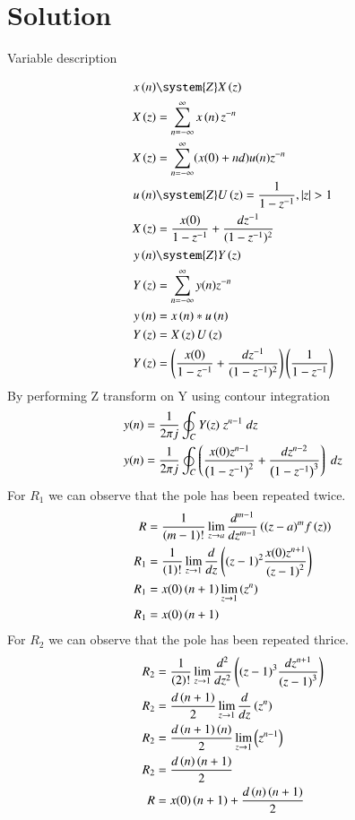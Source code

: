 \documentclass[journal,12pt,twocolumn]{IEEEtran}
\theoremstyle{remark}
\begin{document}
\section*{Solution}
\begin{table}[h]
    \centering
    
    \caption{Variable description}
    \label{tab:11.9.2.11.1}
\end{table}
\begin{align}
	x \brak{n} &\system{Z} X \brak{z} \\
    X \brak{z} &= \sum_{n=-\infty}^{\infty} x \brak{n}   z^{-n}\\
    X \brak{z} & = \sum_{n=-\infty}^{\infty}(x(0)+nd)u(n)z^{-n}\\
    u \brak{n} &\system{Z} U \brak{z} = \dfrac{1}{1-z^{-1}}, |z|>1\\
    X \brak{z} & = \dfrac{x(0)}{1-z^{-1}} + \dfrac{dz^{-1}}{(1-z^{-1})^{2}}\\
    y \brak{n} &\system{Z} Y \brak{z}\\
    Y\brak{z}&=\sum_{n=-\infty}^{\infty}y(n)z^{-n}\\
    y\brak{n}&=x\brak{n}\ast u\brak{n}\\
    Y\brak{z}&=X\brak{z}U\brak{z}\\
    Y\brak{z}&=\brak{\dfrac{x(0)}{1-z^{-1}} + \dfrac{dz^{-1}}{(1-z^{-1})^{2}}}\brak{\dfrac{1}{1-z^{-1}}}
 \end{align}
 By performing Z transform on Y using contour integration
\begin{align}
   y(n)&=\frac{1}{2\pi j}\oint_{C}Y(z) \;z^{n-1} \;dz  \\
   y(n)&=\frac{1}{2\pi j}\oint_{C}\left(\dfrac{x(0)z^{n-1}}{\left(1-z^{-1}\right)^2} + \dfrac{dz^{n-2}}{\left(1-z^{-1}\right)^{3}}\right)\;dz
\end{align}
For $R_1$ we can observe that the pole has been repeated twice.
\begin{align}
    R&=\frac{1}{\left(m-1\right)!}\lim\limits_{z\to a}\frac{d^{m-1}}{dz^{m-1}}\left({(z-a)}^{m}f\left(z\right)\right)  \\
    R_1&=\frac{1}{\left(1\right)!}\lim\limits_{z\to 1}\frac{d}{dz}\left({(z-1)}^{2}\frac{x(0)z^{n+1}}{{(z-1)}^2}\right)\\
    R_1&=x(0)\left(n+1\right)\lim\limits_{z\to 1}\left(z^n\right)\\
    R_1&=x(0)\left(n+1\right)
\end{align}
For $R_2$ we can observe that the pole has been repeated thrice.
\begin{align}
    R_2&=\frac{1}{\left(2\right)!}\lim\limits_{z\to 1}\frac{d^{2}}{dz^{2}}\left({(z-1)}^{3}\frac{dz^{n+1}}{{(z-1)}^3}\right)\\
    R_2&=\frac{d\left(n+1\right)}{2}\lim\limits_{z\to 1}\frac{d}{dz}\left(z^n\right)\\
    R_2&=\frac{d\left(n+1\right)\left(n\right)}{2}\lim\limits_{z\to 1}\left(z^{n-1}\right)\\
    R_2&=\frac{d\left(n\right)\left(n+1\right)}{2}\\
    R&=x(0)\left(n+1\right)+\frac{d\left(n\right)\left(n+1\right)}{2}
\end{align}
\end{document}
